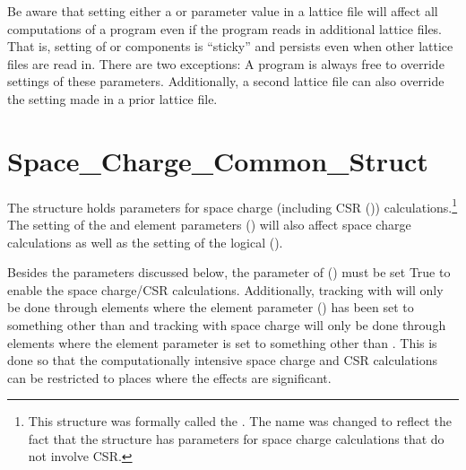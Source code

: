 {Be aware that setting either a  or  parameter value in a lattice file will
affect all computations of a program even if the program reads in additional lattice files. That is,
setting of  or  components is ``sticky'' and persists even when other
lattice files are read in. There are two exceptions: A program is always free to override settings
of these parameters.  Additionally, a second lattice file can also override the setting made in a
prior lattice file.

\section{Space_Charge_Common_Struct}
\label{s:sc.com}

The  structure holds parameters for space charge (including CSR
()) calculations.\footnote
  {
This structure was formally called the . The name was changed to reflect
the fact that the structure has parameters for space charge calculations that do not involve CSR.
  }
The setting of the  and  element parameters
() will also affect space charge calculations as well as the setting of the
 logical  ().

Besides the parameters discussed below, the  parameter of 
() must be set True to enable the space charge/CSR calculations. Additionally,
tracking with  will only be done through elements where the element parameter
 () has been set to something other than  and tracking with
space charge will only be done through elements where the element parameter 
is set to something other than . This is done so that the computationally intensive space
charge and CSR calculations can be restricted to places where the effects are significant.

}
